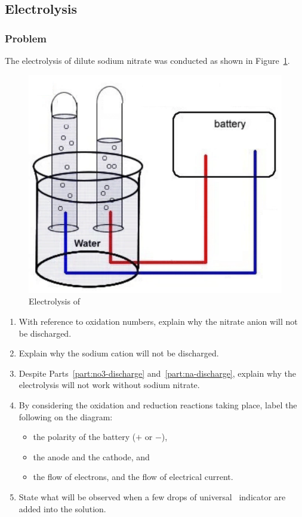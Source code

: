 \subsection{Electrolysis}
\subsubsection{Problem}
The electrolysis of dilute sodium nitrate was conducted as shown in Figure~\ref{fig:electrolysis-nano3}.
\begin{figure}[htpb]
	\centering
	\label{fig:electrolysis-nano3}
	\includegraphics[width=0.4\linewidth]{assets/09_electrolysis_nano3.png}
	\caption{Electrolysis of }
\end{figure}

\begin{enumerate}
	\item With reference to oxidation numbers, explain why the nitrate anion will not be discharged. \label{part:no3-discharge}
	\item Explain why the sodium cation will not be discharged. \label{part:na-discharge}
	\item Despite Parts~\ref{part:no3-discharge} and~\ref{part:na-discharge}, explain why
	      the electrolysis will not work without sodium nitrate.
	\item By considering the oxidation and reduction reactions taking place, label the following on the diagram:
	      \begin{itemize}
		      \item the polarity of the battery (\(+\) or \(-\)),
		      \item the anode and the cathode, and
		      \item the flow of electrons, and the flow of electrical current.
	      \end{itemize}
	\item State what will be observed when a few drops of universal \pH\ indicator
	      are added into the solution.
\end{enumerate}

